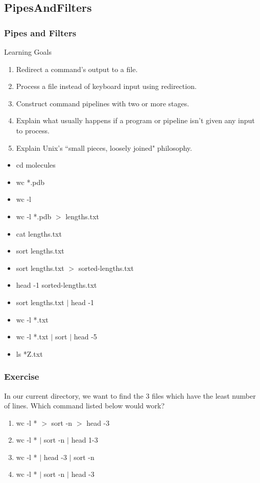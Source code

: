 \documentclass{beamer}
\begin{document}
\subsection*{PipesAndFilters}
\begin{frame}
\frametitle{Pipes and Filters}
\small{
\begin{block}{Learning Goals}
\begin{enumerate}
\item    Redirect a command's output to a file.
\item    Process a file instead of keyboard input using redirection.
\item    Construct command pipelines with two or more stages.
\item    Explain what usually happens if a program or pipeline isn't given any input to process.
\item    Explain Unix's ``small pieces, loosely joined" philosophy.
\end{enumerate}
\end{block}
}
{\footnotesize
\begin{multicols}{2}
\begin{itemize}
\item cd molecules
\item wc *.pdb
\item wc -l
\item wc -l *.pdb $>$ lengths.txt
\item cat lengths.txt
\item sort lengths.txt
\item sort lengths.txt $>$ sorted-lengths.txt
\item head -1 sorted-lengths.txt
\item sort lengths.txt $|$ head -1
\item wc -l *.txt
\item wc -l *.txt $|$ sort $|$ head -5
\item ls *Z.txt
\end{itemize}
\end{multicols}}
\end{frame}


\begin{frame}
\frametitle{Exercise}
In our current directory, we want to find the 3 files which have the least number of lines. Which command listed below would work?

\begin{enumerate}
\item wc -l * $>$ sort -n $>$ head -3
\item wc -l * $|$ sort -n $|$ head 1-3
\item wc -l * $|$ head -3 $|$ sort -n
\item wc -l * $|$ sort -n $|$ head -3
\end{enumerate}
\end{frame}
\end{document}

